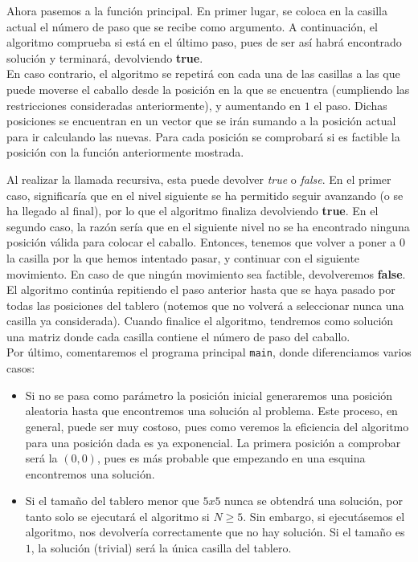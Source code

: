 \documentclass[11pt]{article}
\begin{document}
Ahora pasemos a la función principal. En primer lugar, se coloca en la casilla actual el número de paso que se recibe como argumento. A continuación, el algoritmo comprueba si está en el último paso, pues de ser así habrá encontrado solución y terminará, devolviendo \textbf{true}.\\

En caso contrario, el algoritmo se repetirá con cada una de las casillas a las que puede moverse el caballo desde la posición en la que se encuentra (cumpliendo las restricciones consideradas anteriormente), y aumentando en $1$ el paso. Dichas posiciones se encuentran en un vector que se irán sumando a la posición actual para ir calculando las nuevas. Para cada posición se comprobará si es factible la posición con la función anteriormente mostrada.\\

	
	\vspace{1em}


Al realizar la llamada recursiva, esta puede devolver \textit{true} o \textit{false}. En el primer caso, significaría que en el nivel siguiente se  ha permitido seguir avanzando (o se ha llegado al final), por lo que el algoritmo finaliza devolviendo \textbf{true}. En el segundo caso, la razón sería que en el siguiente nivel no se ha encontrado ninguna posición válida para colocar el caballo. Entonces, tenemos que volver a poner a $0$ la casilla por la que hemos intentado pasar, y continuar con el siguiente movimiento. En caso de que ningún movimiento sea factible, devolveremos \textbf{false}.\\

El algoritmo continúa repitiendo el paso anterior hasta que se haya pasado por todas las posiciones del tablero (notemos que no volverá a seleccionar nunca una casilla ya considerada). Cuando finalice el algoritmo, tendremos como solución una matriz donde cada casilla contiene el número de paso del caballo.\\




Por último, comentaremos el programa principal \verb|main|, donde diferenciamos varios casos:
\begin{itemize}
	\item Si no se pasa como parámetro la posición inicial generaremos una posición aleatoria hasta que encontremos una solución al problema. Este proceso, en general, puede ser muy costoso, pues como veremos la eficiencia del algoritmo para una posición dada es ya exponencial. La primera posición a comprobar será la $(0,0)$, pues es más probable que empezando en una esquina encontremos una solución.
	\item Si el tamaño del tablero menor que $5x5$ nunca se obtendrá una solución, por tanto solo se ejecutará el algoritmo si $N\ge5$. Sin embargo, si ejecutásemos el algoritmo, nos devolvería correctamente que no hay solución. Si el tamaño es $1$, la solución (trivial) será la única casilla del tablero.
\end{itemize}
\end{document}
